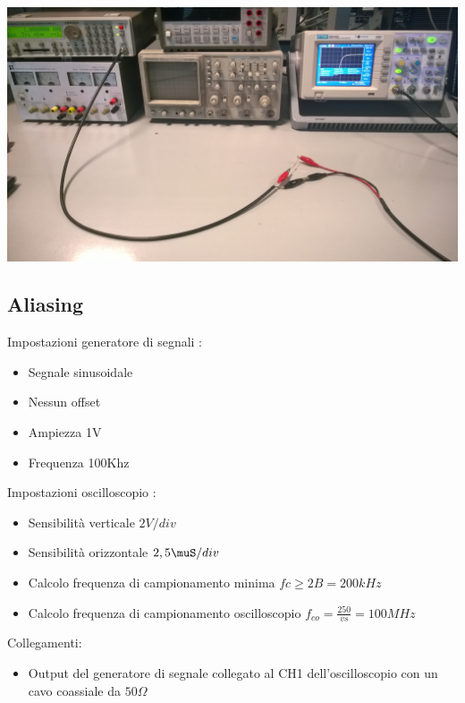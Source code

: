 \documentclass[a4paper]{article}
\begin{document}
\begin{center}
    \includegraphics[scale=0.1]{foto/WP_20141009_012.jpg}
\end{center}

\hfill\break
\hfill\break

\begin{tcolorbox}[breakable,colback=cyan,colframe=cyan]
\section*{Aliasing}
\end{tcolorbox}

Impostazioni generatore di segnali :
\begin{itemize}
\item Segnale sinusoidale
\item Nessun offset
\item Ampiezza 1V
\item Frequenza 100Khz
\end{itemize}

Impostazioni oscilloscopio :
\begin{itemize}
\item Sensibilità verticale \(2 V/div\)
\item Sensibilità orizzontale \(2,5 \muS/div \) 
\item Calcolo frequenza di campionamento minima \(fc \geq 2B = 200 kHz\)
\item Calcolo frequenza di campionamento oscilloscopio \(f_{co}=\tfrac{250}{vs}= 100 MHz\)
\end{itemize}

Collegamenti:
\begin{itemize}
\item Output del generatore di segnale collegato al CH1 dell'oscilloscopio con un cavo coassiale da \(50 \Omega\)  
\end{itemize}
\end{document}
